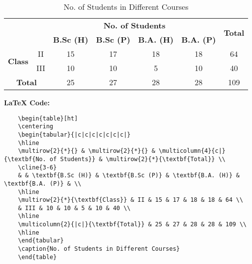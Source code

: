 \begin{enumerate}
    \begin{table}[ht]
    \centering
    \begin{tabular}{|c|c|c|c|c|c|c|}
    \hline
    \multirow{2}{*}{} & \multirow{2}{*}{} & \multicolumn{4}{c|}{\textbf{No. of Students}} & \multirow{2}{*}{\textbf{Total}} \\
    \cline{3-6}
    & & \textbf{B.Sc (H)} & \textbf{B.Sc (P)} & \textbf{B.A. (H)} & \textbf{B.A. (P)} & \\
    \hline
    \multirow{2}{*}{\textbf{Class}} & II & 15 & 17 & 18 & 18 & 64 \\
    & III & 10 & 10 & 5 & 10 & 40 \\
    \hline
    \multicolumn{2}{|c|}{\textbf{Total}} & 25 & 27 & 28 & 28 & 109 \\
    \hline
    \end{tabular}
    \caption{No. of Students in Different Courses}
    \end{table}

    \textbf{LaTeX Code:}
    \begin{verbatim}
    \begin{table}[ht]
    \centering
    \begin{tabular}{|c|c|c|c|c|c|c|}
    \hline
    \multirow{2}{*}{} & \multirow{2}{*}{} & \multicolumn{4}{c|}{\textbf{No. of Students}} & \multirow{2}{*}{\textbf{Total}} \\
    \cline{3-6}
    & & \textbf{B.Sc (H)} & \textbf{B.Sc (P)} & \textbf{B.A. (H)} & \textbf{B.A. (P)} & \\
    \hline
    \multirow{2}{*}{\textbf{Class}} & II & 15 & 17 & 18 & 18 & 64 \\
    & III & 10 & 10 & 5 & 10 & 40 \\
    \hline
    \multicolumn{2}{|c|}{\textbf{Total}} & 25 & 27 & 28 & 28 & 109 \\
    \hline
    \end{tabular}
    \caption{No. of Students in Different Courses}
    \end{table}
    \end{verbatim}

\end{enumerate}


